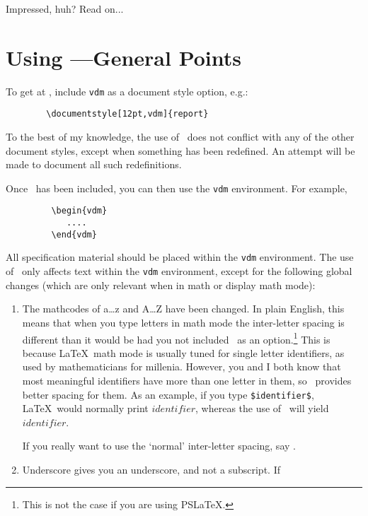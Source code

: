 {\begin{verbatim}
\end{verbatim}

\noindent
Impressed, huh?  Read on...


\section*{Using \Vdm---General Points}

To get at \Vdm, include {\tt vdm\/} as a document style option, e.g.:
\begin{verbatim}
        \documentstyle[12pt,vdm]{report}
\end{verbatim}
\begin{dangerous}
To the best of my knowledge, the use of \Vdm\ does not conflict with
any of the other document styles, except when something has been
redefined.   An attempt will be made to document all such redefinitions.
\end{dangerous}
Once \Vdm\ has been included, you can then use the {\tt vdm\/}
environment.  For example,
\begin{verbatim}
         \begin{vdm}
            ....
         \end{vdm}
\end{verbatim}
All specification material should be placed within the {\tt vdm\/}
environment.  The use of \Vdm\ only affects text within the {\tt vdm\/}
environment, except for the following global changes (which are only
relevant when in math or display math mode):
\begin{enumerate}
\item	The mathcodes of a\dots z and A\dots Z have been changed.  In
	plain English, this means that when you type letters in math
	mode the inter-letter spacing is different than it would be
	had you not included \Vdm\ as an option.\footnote{This is not
	the case if you are using PS\LaTeX.}  This is because
	\LaTeX\ math mode is usually tuned for single letter
	identifiers, as used by mathematicians for millenia.  However,
	you and I both know that most meaningful identifiers have more
	than one letter in them, so \Vdm\ provides better spacing for
	them.  As an example, if you type \verb;$identifier$;, \LaTeX\
	would normally print {$identifier$}, whereas
	the use of \Vdm\ will yield $identifier$.
	\begin{dangerous}\indent If you really want to use the
	`normal' inter-letter spacing, say \cs{}.
	\end{dangerous}
\item	Underscore gives you an underscore, and not a subscript.  If

\end{enumerate}}
